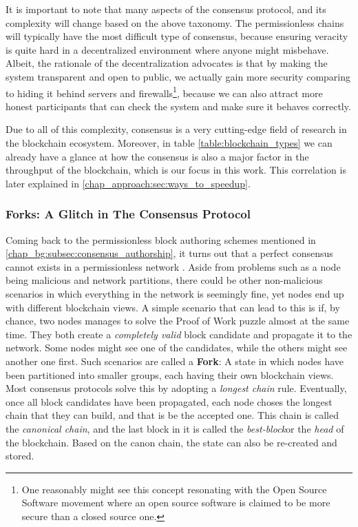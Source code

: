It is important to note that many aspects of the consensus protocol, and its complexity will change
based on the above taxonomy. The permissionless chains will typically have the most difficult type
of consensus, because ensuring veracity is quite hard in a decentralized environment where anyone
might misbehave. Albeit, the rationale of the decentralization advocates is that by making the
system transparent and open to public, we actually gain more security comparing to hiding it behind
servers and firewalls\footnote{One reasonably might see this concept resonating with the Open Source
Software movement where an open source software is claimed to be more secure than a closed source
one.}, because we can also attract more honest participants that can check the system and make sure
it behaves correctly.

Due to all of this complexity, consensus is a very cutting-edge field of research in the blockchain
ecosystem. Moreover, in table \ref{table:blockchain_types} we can already have a glance at how the
consensus is also a major factor in the throughput of the blockchain, which is our focus in this
work. This correlation is later explained in \ref{chap_approach:sec:ways_to_speedup}.

\subsubsection{Forks: A Glitch in The Consensus Protocol}

Coming back to the permissionless block authoring schemes mentioned in
\ref{chap_bg:subsec:consensus_authorship}, it turns out that a perfect consensus cannot exists in a
permissionless network \cite{wangSurveyConsensusMechanisms2019}. Aside from problems such as a node
being malicious and network partitions, there could be other non-malicious scenarios in which
everything in the network is seemingly fine, yet nodes end up with different blockchain views. A
simple scenario that can lead to this is if, by chance, two nodes manages to solve the Proof of Work
puzzle almost at the same time. They both create a \textit{completely valid} block candidate and
propagate it to the network. Some nodes might see one of the candidates, while the others might see
another one first. Such scenarios are called a \textbf{Fork}: A state in which nodes have been
partitioned into smaller groups, each having their own blockchain views. Most consensus protocols
solve this by adopting a \textit{longest chain} rule. Eventually, once all block candidates have
been propagated, each node choses the longest chain that they can build, and that is be the accepted
one. This chain is called the \textit{canonical chain}, and the last block in it is called the
\textit{best-block}or the \textit{head} of the blockchain. Based on the canon chain, the state can
also be re-created and stored.

